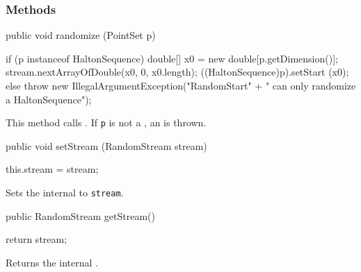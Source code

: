 \subsubsection*{Methods}
\begin{code}

   public void randomize (PointSet p) \begin{hide} {
      if (p instanceof HaltonSequence) {
         double[] x0 = new double[p.getDimension()];
         stream.nextArrayOfDouble(x0, 0, x0.length);
         ((HaltonSequence)p).setStart (x0);
      } else {
         throw new IllegalArgumentException("RandomStart" +
                     " can only randomize a HaltonSequence");
      }
   }
   \end{hide}
\end{code}
\begin{tabb}
   This method calls
   .
   If \texttt{p} is not a
   , an
 is thrown.
\end{tabb}
\begin{htmlonly}
\end{htmlonly}
\begin{code}

   public void setStream (RandomStream stream) \begin{hide} {
      this.stream = stream;
   } \end{hide}
\end{code}
\begin{tabb}
   Sets the internal
    to
   \texttt{stream}.
\end{tabb}
\begin{htmlonly}
\end{htmlonly}
\begin{code}

   public RandomStream getStream() \begin{hide} {
      return stream;
   } \end{hide}
\end{code}
\begin{tabb}
   Returns the internal
   .
\end{tabb}
\begin{htmlonly}
\end{htmlonly}
\begin{code}\begin{hide}
}
\end{hide}\end{code}
